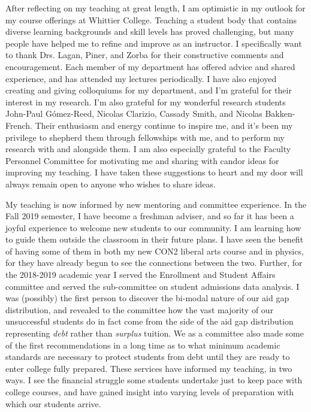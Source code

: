 \documentclass[../../main.tex]{subfiles}
\begin{document}
After reflecting on my teaching at great length, I am optimistic in my outlook for my course offerings at Whittier College.  Teaching a student body that contains diverse learning backgrounds and skill levels has proved challenging, but many people have helped me to refine and improve as an instructor.  I specifically want to thank Drs. Lagan, Piner, and Zorba for their constructive comments and encouragement.  Each member of my department has offered advice and shared experience, and has attended my lectures periodically.  I have also enjoyed creating and giving colloquiums for my department, and I'm grateful for their interest in my research.  I'm also grateful for my wonderful research students John-Paul G\'omez-Reed, Nicolas Clarizio, Cassady Smith, and Nicolas Bakken-French.  Their enthusiasm and energy continue to inspire me, and it's been my privilege to shepherd them through fellowships with me, and to perform my research with and alongside them. I am also especially grateful to the Faculty Personnel Committee for motivating me and sharing with candor ideas for improving my teaching.  I have taken these suggestions to heart and my door will always remain open to anyone who wishes to share ideas.  \\ \hspace{0.1cm}

My teaching is now informed by new mentoring and committee experience.  In the Fall 2019 semester, I have become a freshman adviser, and so far it has been a joyful experience to welcome new students to our community.  I am learning how to guide them outside the classroom in their future plans.  I have seen the benefit of having some of them in both my new CON2 liberal arts course and in physics, for they have already begun to see the connections between the two.  Further, for the 2018-2019 academic year I served the Enrollment and Student Affairs committee and served the sub-committee on student admissions data analysis.  I was (possibly) the first person to discover the bi-modal nature of our aid gap distribution, and revealed to the committee how the vast majority of our unsuccessful students do in fact come from the side of the aid gap distribution representing \textit{debt} rather than \textit{surplus} tuition.  We as a committee also made some of the first recommendations in a long time as to what minimum academic standards are necessary to protect students from debt until they are ready to enter college fully prepared.  These services have informed my teaching, in two ways.  I see the financial struggle some students undertake just to keep pace with college courses, and have gained insight into varying levels of preparation with which our students arrive.  \\ \hspace{0.1cm}
\end{document}
